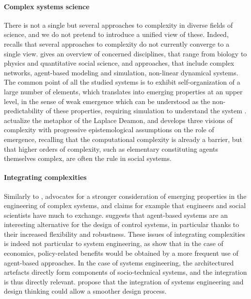 \documentclass[runningheads,a4paper]{llncs2e/llncs}
\begin{document}
\paragraph{Complex systems science}

There is not a single but several approaches to complexity in diverse fields of science, and we do not pretend to introduce a unified view of these. Indeed, \cite{chu2008criteria} recalls that several approaches to complexity do not currently converge to a single view. \cite{newman2011complex} gives an overview of concerned disciplines, that range from biology to physics and quantitative social science, and approaches, that include complex networks, agent-based modeling and simulation, non-linear dynamical systems. The common point of all the studied systems is to exhibit self-organization of a large number of elements, which translates into emerging properties at an upper level, in the sense of weak emergence which can be understood as the non-predictability of these properties, requiring simulation to understand the system \cite{bedau2002downward}. \cite{deffuant2015visions} actualize the metaphor of the Laplace Deamon, and develops three visions of complexity with progressive epistemological assumptions on the role of emergence, recalling that the computational complexity is already a barrier, but that higher orders of complexity, such as elementary constituting agents themselves complex, are often the rule in social systems.


\paragraph{Integrating complexities}


Similarly to \cite{sheard2009principles}, \cite{ottino2004engineering} advocates for a stronger consideration of emerging properties in the engineering of complex systems, and claims for example that engineers and social scientists have much to exchange. \cite{jennings2003agent} suggests that agent-based systems are an interesting alternative for the design of control systems, in particular thanks to their increased flexibility and robustness. These issues of integrating complexities is indeed not particular to system engineering, as \cite{farmer2009economy} show that in the case of economics, policy-related benefits would be obtained by a more frequent use of agent-based approaches. In the case of systems engineering, the architectured artefacts directly form components of socio-technical systems, and the integration is thus directly relevant. \cite{durantin2017disruptive} propose that the integration of systems engineering and design thinking could allow a smoother design process.
\end{document}

